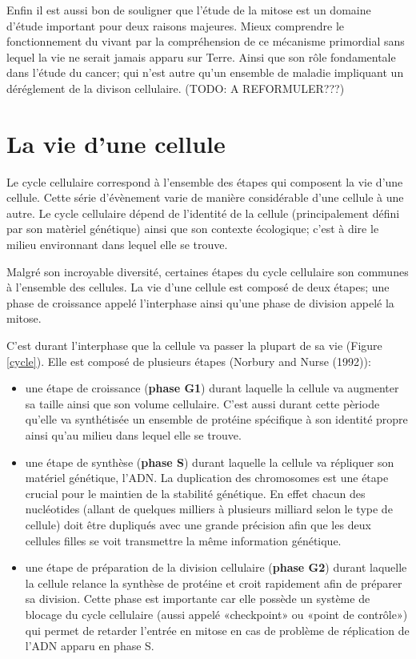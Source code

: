 \documentclass[12pt,a4paper,twoside,openright]{book}
\begin{document}
Enfin il est aussi bon de souligner que l'étude de la mitose est un
domaine d'étude important pour deux raisons majeures. Mieux comprendre
le fonctionnement du vivant par la compréhension de ce mécanisme
primordial sans lequel la vie ne serait jamais apparu sur Terre. Ainsi
que son rôle fondamentale dans l'étude du cancer; qui n'est autre qu'un
ensemble de maladie impliquant un déréglement de la divison cellulaire.
(TODO: A REFORMULER???)

\section{La vie d'une cellule}\label{la-vie-dune-cellule}

Le cycle cellulaire correspond à l'ensemble des étapes qui composent la
vie d'une cellule. Cette série d'évènement varie de manière considérable
d'une cellule à une autre. Le cycle cellulaire dépend de l'identité de
la cellule (principalement défini par son matèriel génétique) ainsi que
son contexte écologique; c'est à dire le milieu environnant dans lequel
elle se trouve.

Malgré son incroyable diversité, certaines étapes du cycle cellulaire
son communes à l'ensemble des cellules. La vie d'une cellule est composé
de deux étapes; une phase de croissance appelé l'interphase ainsi qu'une
phase de division appelé la mitose.

C'est durant l'interphase que la cellule va passer la plupart de sa vie
(Figure \ref{cycle}). Elle est composé de plusieurs étapes (Norbury and
Nurse (1992)):

\begin{itemize}
\item
  une étape de croissance (\textbf{phase G1}) durant laquelle la cellule
  va augmenter sa taille ainsi que son volume cellulaire. C'est aussi
  durant cette pèriode qu'elle va synthétisée un ensemble de protéine
  spécifique à son identité propre ainsi qu'au milieu dans lequel elle
  se trouve.
\item
  une étape de synthèse (\textbf{phase S}) durant laquelle la cellule va
  répliquer son matériel génétique, l'ADN. La duplication des
  chromosomes est une étape crucial pour le maintien de la stabilité
  génétique. En effet chacun des nucléotides (allant de quelques
  milliers à plusieurs milliard selon le type de cellule) doit être
  dupliqués avec une grande précision afin que les deux cellules filles
  se voit transmettre la même information génétique.
\item
  une étape de préparation de la division cellulaire (\textbf{phase G2})
  durant laquelle la cellule relance la synthèse de protéine et croit
  rapidement afin de préparer sa division. Cette phase est importante
  car elle possède un système de blocage du cycle cellulaire (aussi
  appelé «checkpoint» ou «point de contrôle») qui permet de retarder
  l'entrée en mitose en cas de problème de réplication de l'ADN apparu
  en phase S.
\end{itemize}
\end{document}
